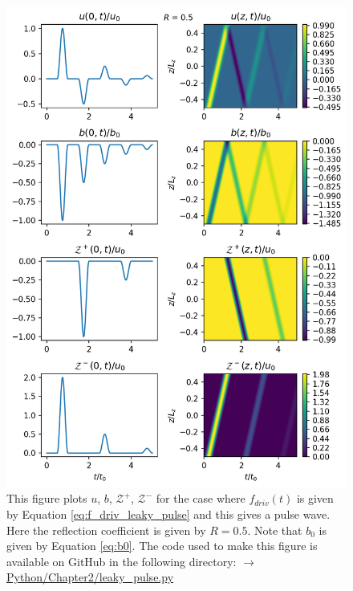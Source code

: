 \begin{figure}
    \centering
    \vspace{-20pt}
    \includegraphics[width=\textwidth,height=0.9\textheight,keepaspectratio]{figures/chapter02/leaky_pulse.png}
    \vspace{-10pt}
    \caption{This figure plots $u$, $b$, $\mathcal{Z}^{+}$, $\mathcal{Z^{-}}$ for the case where $f_{driv}(t)$ is given by Equation \eqref{eq:f_driv_leaky_pulse} and this gives a pulse wave. Here the reflection coefficient is given by $R=0.5$. Note that $b_0$ is given by Equation \eqref{eq:b0}. The code used to make this figure is available on GitHub in the following directory:\newline
    \href{https://github.com/aleksyprok/apkp_thesis/blob/main/Python/Chapter2/leaky_pulse.py}{$\rightarrow$ Python/Chapter2/leaky\_pulse.py}}
    \vspace{-30pt}
    \label{fig:leaky_pulse}
\end{figure}

